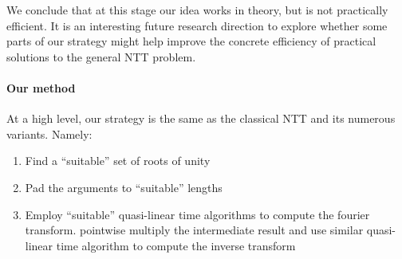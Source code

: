 We conclude that at this stage our idea works in theory, but is not practically efficient. It is an interesting future research direction to explore whether some parts of our strategy might help improve the concrete efficiency of practical solutions to the general NTT problem.

\paragraph{Our method}
At a high level, our strategy is the same as the classical NTT and its numerous variants. Namely:
\begin{enumerate}
    \item Find a ``suitable'' set of roots of unity
    \item Pad the arguments to ``suitable'' lengths
    \item Employ ``suitable'' quasi-linear time algorithms to compute the fourier transform. pointwise multiply the intermediate result and use similar quasi-linear time algorithm to compute the inverse transform
\end{enumerate}

